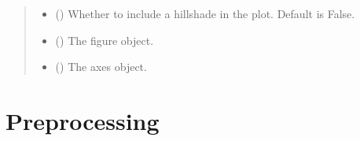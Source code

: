 \documentclass[letterpaper,10pt,english]{sphinxmanual}
\begin{document}
\begin{fulllineitems}
\begin{quote}
\begin{description}
\begin{itemize}
\item {} 
\sphinxAtStartPar
{} (\sphinxstyleliteralemphasis{\sphinxupquote{, }}) \textendash{} Whether to include a hillshade in the plot. Default is False.

\end{itemize}

\sphinxAtStartPar
\begin{itemize}
\item {} 
\sphinxAtStartPar
{} () \textendash{} The figure object.

\item {} 
\sphinxAtStartPar
{} () \textendash{} The axes object.

\end{itemize}


\end{description}\end{quote}

\end{fulllineitems}



\section{Preprocessing}
\label{\detokenize{pysewer:module-pysewer.preprocessing}}\label{\detokenize{pysewer:preprocessing}}
\end{document}
